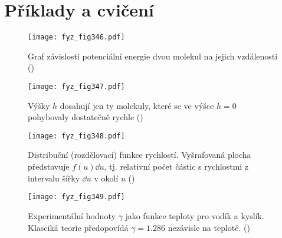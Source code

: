 {  \section{Příklady a cvičení}\label{fyz:IchapXLsecVII}
  
    \begin{figure}[ht!] %
      \centering
      \texttt{[image: fyz\_fig346.pdf]}
      \caption{Graf závislosti potenciální energie dvou molekul na jejich vzdálenosti
               (\cite[s.~543]{Feynman01})}
      \label{fyz_fig346}
    \end{figure}

    \begin{figure}[ht!] %
      \centering
      \texttt{[image: fyz\_fig347.pdf]}
      \caption{Výšky \(h\) dosahují jen ty molekuly, které se ve výšce \(h=0\) pohybovaly 
               dostatečně rychle
               (\cite[s.~545]{Feynman01})}
      \label{fyz_fig347}
    \end{figure}

    \begin{figure}[ht!] %
      \centering
      \texttt{[image: fyz\_fig348.pdf]}
      \caption{Distribuční (rozdělovací) funkce rychlostí. Vyšrafovaná plocha představuje 
               \(f(u)\dd{u}\), tj. relativní počet částic s rychlostmi z intervalu šířky \(\dd{u}\) 
               v okolí \(u\)
               (\cite[s.~525]{Feynman01})}
      \label{fyz_fig348}
    \end{figure}

    \begin{figure}[ht!] %
      \centering
      \texttt{[image: fyz\_fig349.pdf]}
      \caption{Experimentální hodnoty \(\gamma\) jako funkce teploty pro vodík a kyslík. Klasciká 
               teorie předopovídá \(\gamma =\num{1.286}\) nezávisle na teplotě. 
               (\cite[s.~525]{Feynman01})}
      \label{fyz_fig349}
    \end{figure}

} %
\printbibliography[title={Seznam literatury}, heading=subbibliography]

